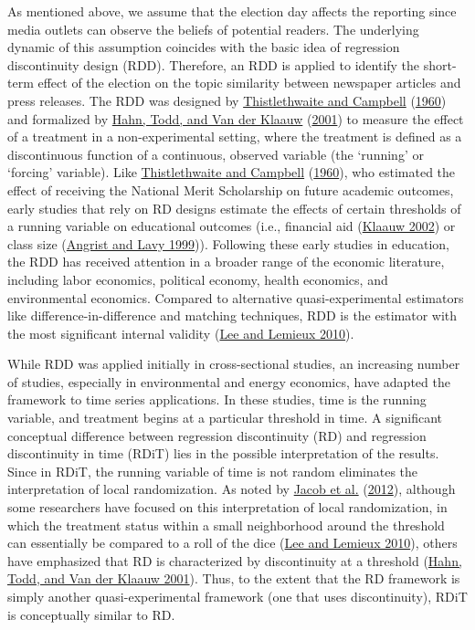 \documentclass[
  12pt,
]{article}
\begin{document}
As mentioned above, we assume that the election day affects the
reporting since media outlets can observe the beliefs of potential
readers. The underlying dynamic of this assumption coincides with the
basic idea of regression discontinuity design (RDD). Therefore, an RDD
is applied to identify the short-term effect of the election on the
topic similarity between newspaper articles and press releases. The RDD
was designed by
\protect\hyperlink{ref-thistlethwaite_regression-discontinuity_1960}{Thistlethwaite
and Campbell}
(\protect\hyperlink{ref-thistlethwaite_regression-discontinuity_1960}{1960})
and formalized by \protect\hyperlink{ref-hahn_identification_2001}{Hahn,
Todd, and Van der Klaauw}
(\protect\hyperlink{ref-hahn_identification_2001}{2001}) to measure the
effect of a treatment in a non-experimental setting, where the treatment
is defined as a discontinuous function of a continuous, observed
variable (the `running' or `forcing' variable). Like
\protect\hyperlink{ref-thistlethwaite_regression-discontinuity_1960}{Thistlethwaite
and Campbell}
(\protect\hyperlink{ref-thistlethwaite_regression-discontinuity_1960}{1960}),
who estimated the effect of receiving the National Merit Scholarship on
future academic outcomes, early studies that rely on RD designs estimate
the effects of certain thresholds of a running variable on educational
outcomes (i.e., financial aid
(\protect\hyperlink{ref-van_der_klaauw_estimating_2002}{Klaauw 2002}) or
class size (\protect\hyperlink{ref-angrist_using_1999}{Angrist and Lavy
1999})). Following these early studies in education, the RDD has
received attention in a broader range of the economic literature,
including labor economics, political economy, health economics, and
environmental economics. Compared to alternative quasi-experimental
estimators like difference-in-difference and matching techniques, RDD is
the estimator with the most significant internal validity
(\protect\hyperlink{ref-lee_regression_2010}{Lee and Lemieux 2010}).

While RDD was applied initially in cross-sectional studies, an
increasing number of studies, especially in environmental and energy
economics, have adapted the framework to time series applications. In
these studies, time is the running variable, and treatment begins at a
particular threshold in time. A significant conceptual difference
between regression discontinuity (RD) and regression discontinuity in
time (RDiT) lies in the possible interpretation of the results. Since in
RDiT, the running variable of time is not random eliminates the
interpretation of local randomization. As noted by
\protect\hyperlink{ref-jacob_practical_2012}{Jacob et al.}
(\protect\hyperlink{ref-jacob_practical_2012}{2012}), although some
researchers have focused on this interpretation of local randomization,
in which the treatment status within a small neighborhood around the
threshold can essentially be compared to a roll of the dice
(\protect\hyperlink{ref-lee_regression_2010}{Lee and Lemieux 2010}),
others have emphasized that RD is characterized by discontinuity at a
threshold (\protect\hyperlink{ref-hahn_identification_2001}{Hahn, Todd,
and Van der Klaauw 2001}). Thus, to the extent that the RD framework is
simply another quasi-experimental framework (one that uses
discontinuity), RDiT is conceptually similar to RD.
\end{document}
